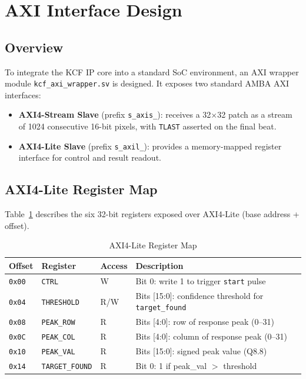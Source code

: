 \documentclass[a4paper,12pt]{report}
\begin{document}
\section{AXI Interface Design}

\subsection{Overview}

To integrate the KCF IP core into a standard SoC environment, an AXI wrapper module \texttt{kcf\_axi\_wrapper.sv} is designed. It exposes two standard AMBA AXI interfaces:

\begin{itemize}
    \item \textbf{AXI4-Stream Slave} (prefix \texttt{s\_axis\_}): receives a 32$\times$32 patch as a stream of 1024 consecutive 16-bit pixels, with \texttt{TLAST} asserted on the final beat.
    \item \textbf{AXI4-Lite Slave} (prefix \texttt{s\_axil\_}): provides a memory-mapped register interface for control and result readout.
\end{itemize}

\subsection{AXI4-Lite Register Map}

Table~\ref{tab:regmap} describes the six 32-bit registers exposed over AXI4-Lite (base address + offset).

\begin{table}[ht]
\centering
\caption{AXI4-Lite Register Map}
\vspace{0.2cm}
\label{tab:regmap}
\begin{tabular}{|l|l|l|l|}
\hline
\textbf{Offset} & \textbf{Register} & \textbf{Access} & \textbf{Description} \\ \hline
\texttt{0x00} & \texttt{CTRL} & W & Bit 0: write 1 to trigger \texttt{start} pulse \\ \hline
\texttt{0x04} & \texttt{THRESHOLD} & R/W & Bits [15:0]: confidence threshold for \texttt{target\_found} \\ \hline
\texttt{0x08} & \texttt{PEAK\_ROW} & R & Bits [4:0]: row of response peak (0--31) \\ \hline
\texttt{0x0C} & \texttt{PEAK\_COL} & R & Bits [4:0]: column of response peak (0--31) \\ \hline
\texttt{0x10} & \texttt{PEAK\_VAL} & R & Bits [15:0]: signed peak value (Q8.8) \\ \hline
\texttt{0x14} & \texttt{TARGET\_FOUND} & R & Bit 0: 1 if peak\_val $>$ threshold \\ \hline
\end{tabular}
\end{table}
\end{document}
